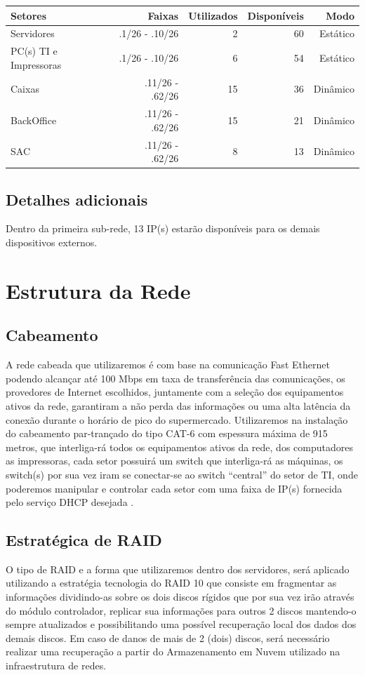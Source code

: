 \documentclass[12pt]{article}
\begin{document}
\begin{center}
\begin{tabular}{| l | r | r | r | r |}
\hline 
Setores & Faixas & Utilizados & Disponíveis & Modo\\
\hline
Servidores & .1/26 - .10/26 & 2 & 60 & Estático\\
PC(s) TI e Impressoras & .1/26 - .10/26 & 6 & 54 & Estático\\
Caixas & .11/26 - .62/26 & 15 & 36 & Dinâmico\\
BackOffice & .11/26 - .62/26 & 15 & 21 & Dinâmico\\
SAC & .11/26 - .62/26 & 8 & 13 & Dinâmico\\
\hline
\end{tabular}
\end{center}

\subsection{Detalhes adicionais}
Dentro da primeira sub-rede, 13 IP(s) estarão disponíveis para os demais dispositivos externos.

\section{Estrutura da Rede}

\subsection{Cabeamento}
A rede cabeada que utilizaremos é com base na comunicação Fast Ethernet podendo alcançar até 100 Mbps em taxa de transferência das comunicações, os provedores de Internet escolhidos, juntamente com a seleção dos equipamentos ativos da rede, garantiram a não perda das informações ou uma alta latência da conexão durante o horário de pico do supermercado. Utilizaremos na instalação do cabeamento par-trançado do tipo CAT-6 com espessura máxima de 915 metros, que interliga-rá todos os equipamentos ativos da rede, dos computadores as impressoras, cada setor possuirá um switch que interliga-rá as máquinas, os switch(s) por sua vez iram se conectar-se ao switch “central” do setor de TI, onde poderemos manipular e controlar cada setor com uma faixa de IP(s) fornecida pelo serviço DHCP desejada
.
\subsection{Estratégica de RAID}
O tipo de RAID e a forma que utilizaremos dentro dos servidores, será aplicado utilizando a estratégia tecnologia do RAID 10 que consiste em fragmentar as informações dividindo-as sobre os dois discos rígidos que por sua vez irão através do módulo controlador, replicar sua informações para outros 2 discos mantendo-o sempre atualizados e possibilitando uma possível recuperação local dos dados dos demais discos. Em caso de danos de mais de 2 (dois) discos, será necessário realizar uma recuperação a partir do Armazenamento em Nuvem utilizado na infraestrutura de redes.
\end{document}
